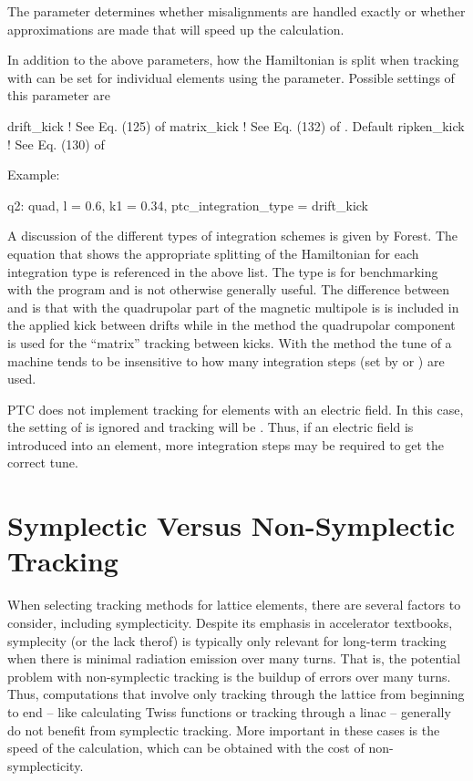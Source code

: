 The  parameter determines whether misalignments are handled exactly or
whether approximations are made that will speed up the calculation.

In addition to the above parameters, how the Hamiltonian is split when tracking with  can be
set for individual elements using the  parameter. Possible settings of this
parameter are
\begin{example}
  drift_kick    ! See Eq. (125) of \cite{b:geo.int}
  matrix_kick   ! See Eq. (132) of \cite{b:geo.int}. Default
  ripken_kick   ! See Eq. (130) of \cite{b:geo.int}
\end{example}
Example:
\begin{example}
  q2: quad, l = 0.6, k1 = 0.34, ptc_integration_type = drift_kick
\end{example}
A discussion of the different types of integration schemes is given by Forest\cite{b:geo.int}. The
equation that shows the appropriate splitting of the Hamiltonian for each integration type is
referenced in the above list. The  type is for benchmarking with the 
program and is not otherwise generally useful. The difference between  and
 is that with  the quadrupolar part of the magnetic multipole is is
included in the applied kick between drifts while in the  method the quadrupolar
component is used for the ``matrix'' tracking between kicks. With the  method the
tune of a machine tends to be insensitive to how many integration steps (set by  or
) are used.

PTC does not implement  tracking for elements with an electric field. In this case,
the setting of  is ignored and tracking will be . Thus, if
an electric field is introduced into an element, more integration steps may be required to get the
correct tune.

\section{Symplectic Versus Non-Symplectic Tracking}
\label{s:non.symp}

When selecting tracking methods for lattice elements, there are several factors to consider,
including symplecticity. Despite its emphasis in accelerator textbooks, symplecity (or the lack
therof) is typically only relevant for long-term tracking when there is minimal radiation emission
over many turns. That is, the potential problem with non-symplectic tracking is the buildup of
errors over many turns. Thus, computations that involve only tracking through the lattice from
beginning to end -- like calculating Twiss functions or tracking through a linac -- generally do not
benefit from symplectic tracking. More important in these cases is the speed of the calculation, 
which can be obtained with the cost of non-symplecticity.

